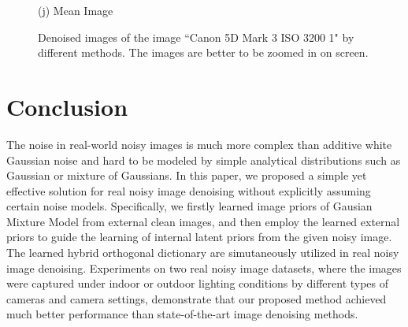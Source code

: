 \documentclass[10pt,twocolumn,letterpaper]{article}
\begin{document}
\begin{figure}
{\begin{minipage}[t]{0.195\textwidth}
{\footnotesize (j) Mean Image \cite{crosschannel2016}}
\end{minipage}
}\vspace{-1mm}
\caption{Denoised images of the image ``Canon 5D Mark 3 ISO 3200 1" by different methods. The images are better to be zoomed in on screen.}
\vspace{-1mm}
\label{fig6}
\end{figure}


\section{Conclusion}

The noise in real-world noisy images is much more complex than additive white Gaussian noise and hard to be modeled by simple analytical distributions such as Gaussian or mixture of Gaussians. In this paper, we proposed a simple yet effective solution for real noisy image denoising without explicitly assuming certain noise models. Specifically, we firstly learned image priors of Gausian Mixture Model from external clean images, and then employ the learned external priors to guide the learning of internal latent priors from the given noisy image. The learned hybrid orthogonal dictionary are simutaneously utilized in real noisy image denoising. Experiments on two real noisy image datasets, where the images were captured under indoor or outdoor lighting conditions by different types of cameras and camera settings, demonstrate that our proposed method achieved much better performance than state-of-the-art image denoising methods.



{
\small


}
\end{document}
